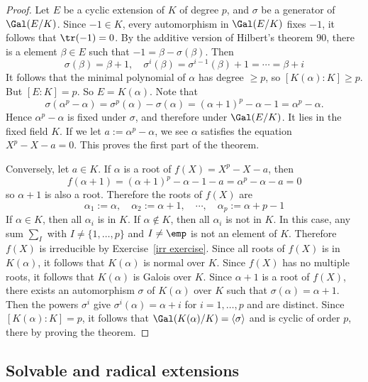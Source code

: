 \begin{proof}
Let $E$ be a cyclic extension of $K$ of degree $p$, and $\sigma$ be a generator of $\Gal(E/K)$. Since $-1\in K$, every automorphism in $\Gal(E/K)$ fixes $-1$, it follows that $\tr(-1)=0$. By the additive version of Hilbert's theorem $90$, there is a element $\beta\in E$ such that $-1=\beta-\sigma(\beta)$. Then
\[\sigma(\beta)=\beta+1,\quad\sigma^i(\beta)=\sigma^{i-1}(\beta)+1=\cdots=\beta+i\]
It follows that the minimal polynomial of $\alpha$ has degree $\geq p$, so $[K(\alpha):K]\geq p$. But $[E:K]=p$. So $E=K(\alpha)$. Note that
\[\sigma(\alpha^p-\alpha)=\sigma^p(\alpha)-\sigma(\alpha)=(\alpha+1)^p-\alpha-1=\alpha^p-\alpha.\]
Hence $\alpha^p-\alpha$ is fixed under $\sigma$, and therefore under $\Gal(E/K)$. It lies in the fixed field $K$. If we let $a:=\alpha^p-\alpha$, we see $\alpha$ satisfies the equation $X^p-X-a=0$. This proves the first part of the theorem.\par
Conversely, let $a\in K$. If $\alpha$ is a root of $f(X)=X^p-X-a$, then
\[f(\alpha+1)=(\alpha+1)^p-\alpha-1-a=\alpha^p-\alpha-a=0\]
so $\alpha+1$ is also a root. Therefore the roots of $f(X)$ are 
\[\alpha_1:=\alpha,\quad\alpha_2:=\alpha+1,\quad\cdots,\quad\alpha_p:=\alpha+p-1\]
If $\alpha\in K$, then all $\alpha_i$ is in $K$. If $\alpha\notin K$, then all $\alpha_i$ is not in $K$. In this case, any sum $\sum_I$ with $I\neq\{1,\dots,p\}$ and $I\neq\emp$ is not an element of $K$. Therefore $f(X)$ is irreducible by Exercise~\ref{irr exercise}. Since all roots of $f(X)$ is in $K(\alpha)$, it follows that $K(\alpha)$ is normal over $K$. Since $f(X)$ has no multiple roots, it follows that $K(\alpha)$ is Galois over $K$. Since $\alpha+1$ is a root of $f(X)$, there exists an automorphism $\sigma$ of $K(\alpha)$ over $K$ such that $\sigma(\alpha)=\alpha+1$. Then the powers $\sigma^i$ give $\sigma^i(\alpha)=\alpha+i$ for $i=1,\dots,p$ and are distinct. Since $[K(\alpha):K]=p$, it follows that $\Gal(K(\alpha)/K)=\langle\sigma\rangle$ and is cyclic of order $p$, there by proving the theorem.
\end{proof}
\subsection{Solvable and radical extensions}
